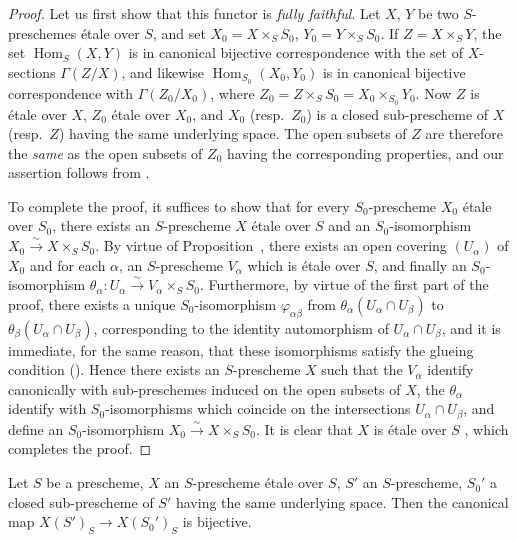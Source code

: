 \begin{proof}
Let us first show that this functor is \emph{fully faithful}.
Let $X$, $Y$ be two $S$-preschemes \'etale over $S$, and set $X_0=X\times_S S_0$, $Y_0=Y\times_S S_0$.
If $Z=X\times_S Y$, the set $\operatorname{Hom}_S(X,Y)$ is in canonical bijective correspondence with the set of $X$-sections $\Gamma(Z/X)$, and likewise $\operatorname{Hom}_{S_0}(X_0,Y_0)$ is in canonical bijective correspondence with $\Gamma(Z_0/X_0)$, where $Z_0=Z\times_S S_0=X_0\times_{S_0}Y_0$.
Now $Z$ is \'etale over $X$, $Z_0$ \'etale over $X_0$, and $X_0$ (resp.\ $Z_0$) is a closed sub-prescheme of $X$ (resp.\ $Z$) having the same underlying space.
The open subsets of $Z$ are therefore the \emph{same} as the open subsets of $Z_0$ having the corresponding properties, and our assertion follows from .

To complete the proof, it suffices to show that for every $S_0$-prescheme $X_0$ \'etale over $S_0$, there exists an $S$-prescheme $X$ \'etale over $S$ and an $S_0$-isomorphism $X_0\xrightarrow{\sim}X\times_S S_0$.
By virtue of Proposition~, there exists an open covering $(U_\alpha)$ of $X_0$ and for each $\alpha$, an $S$-prescheme $V_\alpha$ which is \'etale over $S$, and finally an $S_0$-isomorphism $\theta_\alpha:U_\alpha\xrightarrow{\sim}V_\alpha\times_S S_0$.
Furthermore, by virtue of the first part of the proof, there exists a unique $S_0$-isomorphism $\varphi_{\alpha\beta}$ from $\theta_\alpha(U_\alpha\cap U_\beta)$ to $\theta_\beta(U_\alpha\cap U_\beta)$, corresponding to the identity automorphism of $U_\alpha\cap U_\beta$, and it is immediate, for the same reason, that these isomorphisms satisfy the glueing condition ().
Hence there exists an $S$-prescheme $X$ such that the $V_\alpha$ identify canonically with sub-preschemes induced on the open subsets of $X$, the $\theta_\alpha$ identify with $S_0$-isomorphisms which coincide on the intersections $U_\alpha\cap U_\beta$, and define an $S_0$-isomorphism $X_0\xrightarrow{\sim}X\times_S S_0$.
It is clear that $X$ is \'etale over $S$ , which completes the proof.
\end{proof}

\begin{corollary}[18.1.3]
\label{IV.18.1.3.cor}
Let $S$ be a prescheme, $X$ an $S$-prescheme \'etale over $S$, $S'$ an $S$-prescheme, $S_0'$ a closed sub-prescheme of $S'$ having the same underlying space.
Then the canonical map $X(S')_S\to X(S_0')_S$  is bijective.
\end{corollary}

